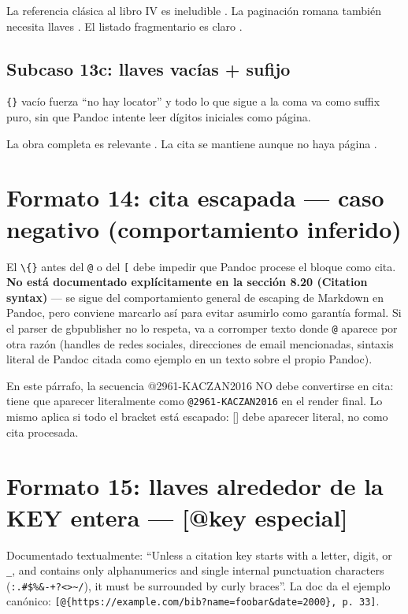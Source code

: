 La referencia clásica al libro IV es ineludible \autocite[\{libro IV, cap. 3\}]{3041-PINEAU1999}. La paginación romana también necesita llaves \autocite[p. xiv]{3036-ORBUCH2020}. El listado fragmentario es claro \autocite[\{pp. iv, vi-xi, (xv)-(xvii)\}]{3036-ORBUCH2020}.


\subsection{Subcaso 13c: llaves vacías + sufijo}
\texttt{\{\}} vacío fuerza “no hay locator” y todo lo que sigue a la coma va como suffix puro, sin que Pandoc intente leer dígitos iniciales como página.

La obra completa es relevante \autocite[sin paginación específica]{3036-ORBUCH2020}. La cita se mantiene aunque no haya página \autocite[passim]{2961-KACZAN2016}.



\section{Formato 14: cita escapada — caso negativo (comportamiento inferido)}
El \texttt{\textbackslash\{\}} antes del \texttt{@} o del \texttt{[} debe impedir que Pandoc procese el bloque como cita. \textbf{No está documentado explícitamente en la sección 8.20 (Citation syntax)} — se sigue del comportamiento general de escaping de Markdown en Pandoc, pero conviene marcarlo así para evitar asumirlo como garantía formal. Si el parser de gbpublisher no lo respeta, va a corromper texto donde \texttt{@} aparece por otra razón (handles de redes sociales, direcciones de email mencionadas, sintaxis literal de Pandoc citada como ejemplo en un texto sobre el propio Pandoc).

En este párrafo, la secuencia @2961-KACZAN2016 NO debe convertirse en cita: tiene que aparecer literalmente como \texttt{@2961-KACZAN2016} en el render final. Lo mismo aplica si todo el bracket está escapado: [\textcite{3041-PINEAU1999}] debe aparecer literal, no como cita procesada.


\section{Formato 15: llaves alrededor de la KEY entera — [@{key especial}]}
Documentado textualmente: “Unless a citation key starts with a letter, digit, or \texttt{\_}, and contains only alphanumerics and single internal punctuation characters (\texttt{:.\#\$\%\&-+?<>\textasciitilde{}/}), it must be surrounded by curly braces”. La doc da el ejemplo canónico: \texttt{[@\{https://example.com/bib?name=foobar\&date=2000\}, p. 33]}.

